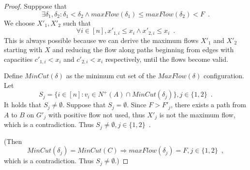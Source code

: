 \begin{proof}
  Supppose that
  \begin{equation*}
    \exists \delta_1, \delta_2 : \delta_1 < \delta_2 \wedge maxFlow\left(\delta_1\right) \leq maxFlow\left(\delta_2\right)
    < F \enspace.
  \end{equation*}
  We choose $X'_1, X'_2$ such that
  \begin{equation*}
    \forall i \in [n], x'_{1, i} \leq x_i \wedge x'_{2, i} \leq x_i \enspace.
  \end{equation*}
  This is always possible because we can derive the maximum flows $X'_1$ and $X'_2$ starting with $X$ and reducing the flow
  along paths beginning from edges with capacities $c'_{1,i} < x_i$ and $c'_{2,i} < x_i$ respectively, until the flows become
  valid.

  Define $MinCut\left(\delta\right)$ as the minimum cut set of the $MaxFlow\left(\delta\right)$ configuration. Let
  \begin{equation*}
    S_j = \{i \in [n] : v_i \in N^{+}\left(A\right) \cap MinCut\left(\delta_j\right)\}, j \in \{1, 2\} \enspace.
  \end{equation*}
  It holds that $S_j \neq \emptyset$. Suppose that $S_j = \emptyset$. Since $F > F'_j$, there exists a path from $A$ to $B$
  on $G'_j$ with positive flow not used, thus $X'_j$ is not the maximum flow, which is a contradiction. Thus
  $S_j \neq \emptyset, j \in \{1, 2\} \enspace.$

  (Then \begin{equation*}
    MinCut\left(\delta_j\right) = MinCut\left(C\right) \Rightarrow maxFlow\left(\delta_j\right) = F, j \in \{1, 2\}
    \enspace,
  \end{equation*}
  which is a contradiction. Thus $S_j \neq \emptyset$.)


\end{proof}
